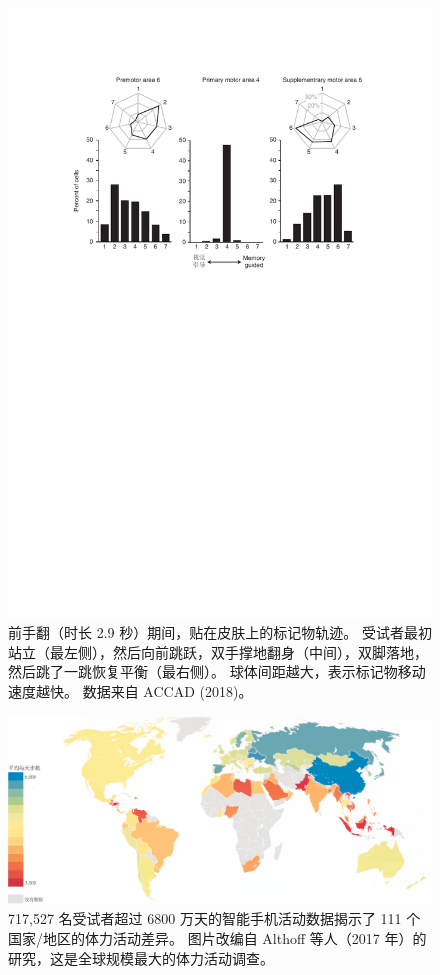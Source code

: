 \begin{figure}[!htb]
	\centering
	\includegraphics[width=1.0\linewidth]{chap1/1_10}
	\caption{前手翻（时长 2.9 秒）期间，贴在皮肤上的标记物轨迹。
		受试者最初站立（最左侧），然后向前跳跃，双手撑地翻身（中间），双脚落地，然后跳了一跳恢复平衡（最右侧）。
		球体间距越大，表示标记物移动速度越快。
		数据来自 ACCAD (2018)。 \label{fig:1_10}}
\end{figure}


\begin{figure}[!htb]
	\centering
	\includegraphics[width=1.0\linewidth]{chap1/1_11}
	\caption{717,527 名受试者超过 6800 万天的智能手机活动数据揭示了 111 个国家/地区的体力活动差异。
		图片改编自 Althoff 等人（2017 年）的研究，这是全球规模最大的体力活动调查\cite{althoff2017large}。 \label{fig:1_11}}
\end{figure}



